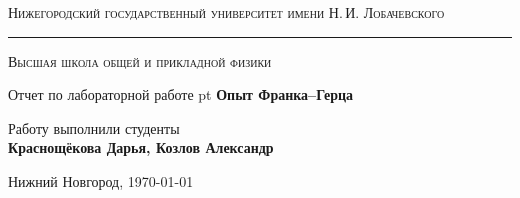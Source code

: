 \begin{titlepage}
	\begin{center}
	{\small\textsc{Нижегородский государственный университет имени Н.\,И. Лобачевского}}
	\vskip 2pt \hrule \vskip 3pt
	{\small\textsc{Высшая школа общей и прикладной физики}}

	\vfill


	{{\large Отчет по лабораторной работе} pt {\Large \bfseries Опыт Франка–Герца}}

		
	\vspace{2cm}
	{\large Работу выполнили студенты \\[0.5em]{\Large \bfseries Краснощёкова Дарья, Козлов Александр}}

	\end{center}

	\vfill

	\begin{center}
	{Нижний Новгород, \today}
	\end{center}
\end{titlepage}